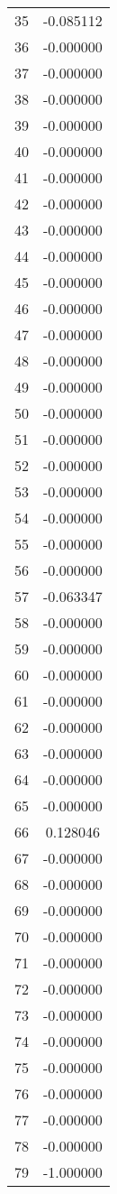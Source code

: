 \documentclass[12pt]{article}
\begin{document}
\begin{longtable}{@{}cc@{}}
35 & -0.085112 \\
36 & -0.000000 \\
37 & -0.000000 \\
38 & -0.000000 \\
39 & -0.000000 \\
40 & -0.000000 \\
41 & -0.000000 \\
42 & -0.000000 \\
43 & -0.000000 \\
44 & -0.000000 \\
45 & -0.000000 \\
46 & -0.000000 \\
47 & -0.000000 \\
48 & -0.000000 \\
49 & -0.000000 \\
50 & -0.000000 \\
51 & -0.000000 \\
52 & -0.000000 \\
53 & -0.000000 \\
54 & -0.000000 \\
55 & -0.000000 \\
56 & -0.000000 \\
57 & -0.063347 \\
58 & -0.000000 \\
59 & -0.000000 \\
60 & -0.000000 \\
61 & -0.000000 \\
62 & -0.000000 \\
63 & -0.000000 \\
64 & -0.000000 \\
65 & -0.000000 \\
66 & 0.128046 \\
67 & -0.000000 \\
68 & -0.000000 \\
69 & -0.000000 \\
70 & -0.000000 \\
71 & -0.000000 \\
72 & -0.000000 \\
73 & -0.000000 \\
74 & -0.000000 \\
75 & -0.000000 \\
76 & -0.000000 \\
77 & -0.000000 \\
78 & -0.000000 \\
79 & -1.000000 \\

\end{longtable}
\end{document}
